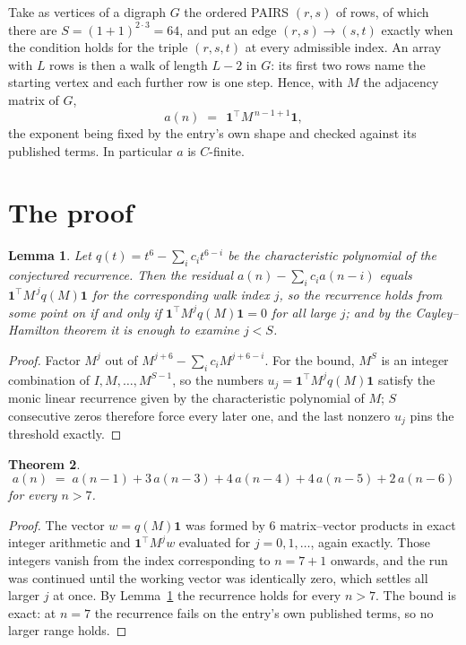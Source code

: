 \documentclass[11pt,a4paper]{article}
\theoremstyle{plain}
\newtheorem{theorem}{Theorem}
\newtheorem{lemma}[theorem]{Lemma}
\theoremstyle{definition}
\begin{document}
Take as vertices of a digraph $G$ the ordered PAIRS $(r,s)$ of rows, of which there are
$S=(1+1)^{2\cdot3}=64$, and put an edge $(r,s)\to(s,t)$ exactly when the condition
holds for the triple $(r,s,t)$ at every admissible index. An array with $L$ rows is then a
walk of length $L-2$ in $G$: its first two rows name the starting vertex and each further
row is one step. Hence, with $M$ the adjacency matrix of $G$,
\[
a(n)\;=\;\,\mathbf{1}^{\!\top}M^{\,n-1+1}\mathbf{1},
\]
the exponent being fixed by the entry's own shape and checked against its published terms.
In particular $a$ is $C$-finite.

\section{The proof}

\begin{lemma}\label{lem:crit}
Let $q(t)=t^{6}-\sum_i c_it^{6-i}$ be the characteristic polynomial of the
conjectured recurrence. Then the residual $a(n)-\sum_ic_ia(n-i)$ equals
$\mathbf{1}^{\!\top}M^{\,j}q(M)\mathbf{1}$ for the corresponding walk index
$j$, so the recurrence holds from some point on if and only if
$\mathbf{1}^{\!\top}M^{j}q(M)\mathbf{1}=0$ for all large $j$; and by the
Cayley--Hamilton theorem it is enough to examine $j<S$.
\end{lemma}

\begin{proof}
Factor $M^{j}$ out of $M^{j+6}-\sum_ic_iM^{j+6-i}$. For the bound, $M^{S}$
is an integer combination of $I,M,\dots,M^{S-1}$, so the numbers
$u_j=\mathbf{1}^{\!\top}M^{j}q(M)\mathbf{1}$ satisfy the monic linear recurrence given by
the characteristic polynomial of $M$; $S$ consecutive zeros therefore force every later one,
and the last nonzero $u_j$ pins the threshold exactly.
\end{proof}

\begin{theorem}
\[
a(n)\;=\;a(n-1) + 3\,a(n-3) + 4\,a(n-4) + 4\,a(n-5) + 2\,a(n-6)
\]
for every $n>7$.
\end{theorem}

\begin{proof}
The vector $w=q(M)\mathbf{1}$ was formed by $6$ matrix--vector products in exact
integer arithmetic and $\mathbf{1}^{\!\top}M^{j}w$ evaluated for $j=0,1,\dots$, again
exactly. Those integers vanish from the index corresponding to $n=7+1$ onwards, and the
run was continued until the working vector was identically zero, which settles all larger $j$
at once. By Lemma~\ref{lem:crit} the recurrence holds for every $n>7$. The bound is exact: at $n=7$ the recurrence fails on the entry's own published terms, so no larger range holds.
\end{proof}
\end{document}
